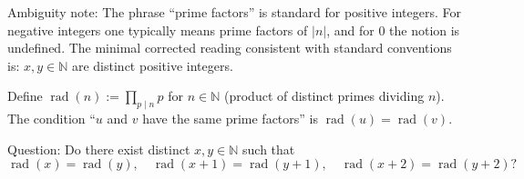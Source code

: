Ambiguity note: The phrase “prime factors” is standard for positive integers. For negative integers one typically means prime factors of $|n|$, and for $0$ the notion is undefined. The minimal corrected reading consistent with standard conventions is: $x,y\in\mathbb{N}$ are distinct positive integers.

Define $\operatorname{rad}(n):=\prod_{p\mid n} p$ for $n\in\mathbb{N}$ (product of distinct primes dividing $n$). The condition “$u$ and $v$ have the same prime factors” is $\operatorname{rad}(u)=\operatorname{rad}(v)$.

Question: Do there exist distinct $x,y\in\mathbb{N}$ such that
\[
\operatorname{rad}(x)=\operatorname{rad}(y),\quad \operatorname{rad}(x+1)=\operatorname{rad}(y+1),\quad \operatorname{rad}(x+2)=\operatorname{rad}(y+2)?
\]
